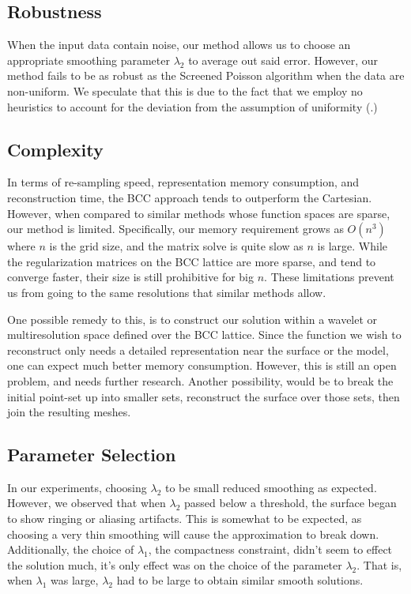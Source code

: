 \subsection{Robustness}
When the input data contain noise, our method allows us to choose an appropriate smoothing parameter $\lambda_2$ to average out said error. However, our method fails to be as robust as the Screened Poisson algorithm when the data are non-uniform. We speculate that this is due to the fact that we employ no heuristics to account for the deviation from the assumption of uniformity (.)

\subsection{Complexity}
In terms of re-sampling speed, representation memory consumption, and reconstruction time, the BCC approach tends to outperform the Cartesian. However, when compared to similar methods whose function spaces are sparse, our method is limited. Specifically, our memory requirement grows as $O(n^3)$ where $n$ is the grid size, and the matrix solve is quite slow as $n$ is large. While the regularization matrices on the BCC lattice are more sparse, and tend to converge faster, their size is still prohibitive for big $n$. These limitations prevent us from going to the same resolutions that similar methods allow.

One possible remedy to this, is to construct our solution within a wavelet or multiresolution space defined over the BCC lattice. Since the function we wish to reconstruct only needs a detailed representation near the surface or the model, one can expect much better memory consumption. However, this is still an open problem, and needs further research. Another possibility, would be to break the initial point-set up into smaller sets, reconstruct the surface over those sets, then join the resulting meshes. 

\subsection{Parameter Selection}
In our experiments, choosing $\lambda_2$ to be small reduced smoothing as expected. However, we observed that when $\lambda_2$ passed below a threshold, the surface began to show ringing or aliasing artifacts. This is somewhat to be expected, as choosing a very thin smoothing will cause the approximation  to break down. Additionally, the choice of $\lambda_1$, the compactness constraint, didn't seem to effect the solution much, it's only effect was on the choice of the parameter $\lambda_2$. That is, when $\lambda_1$ was large, $\lambda_2$ had to be large to obtain similar smooth solutions.

